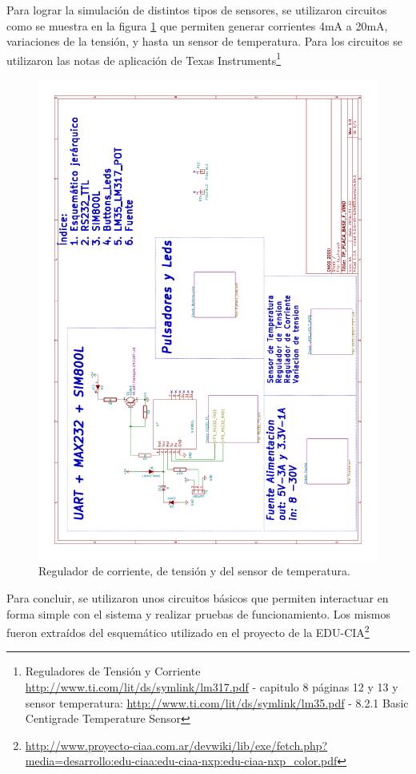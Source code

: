 Para lograr la simulación de distintos tipos de sensores, se utilizaron circuitos como se muestra en la figura \ref{fig:temp_tens}  que permiten generar corrientes 4mA a 20mA, variaciones de la tensión, y hasta un sensor de temperatura. Para los circuitos se utilizaron las notas de aplicación de Texas Instruments\footnote{Reguladores de Tensión y Corriente \url{http://www.ti.com/lit/ds/symlink/lm317.pdf} - capitulo 8 páginas 12 y 13 y sensor temperatura: \url{http://www.ti.com/lit/ds/symlink/lm35.pdf} - 8.2.1 Basic Centigrade Temperature Sensor } 
\begin{figure}[!htb]
  \centering
  \includegraphics[page=4,scale=0.3,angle=270]{./Figures/schematic.pdf}
  \caption{Regulador de corriente, de tensión y del sensor de temperatura.}
  \label{fig:temp_tens}
\end{figure}

Para concluir, se utilizaron unos circuitos básicos que permiten interactuar en forma simple con el sistema y realizar pruebas de funcionamiento. Los mismos fueron extraídos del esquemático utilizado en el proyecto de la EDU-CIA\footnote{\url{http://www.proyecto-ciaa.com.ar/devwiki/lib/exe/fetch.php?media=desarrollo:edu-ciaa:edu-ciaa-nxp:edu-ciaa-nxp\_color.pdf}}


